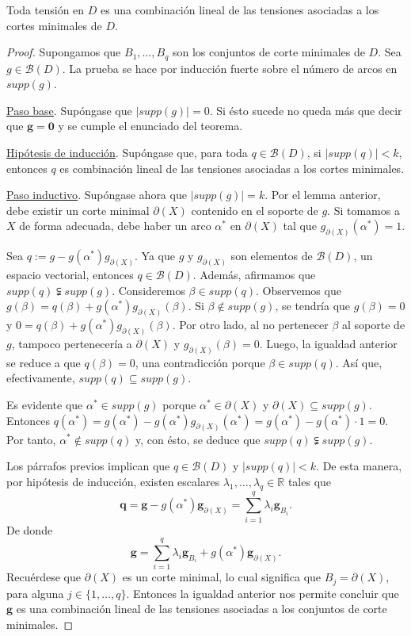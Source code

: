 \begin{teo}  \label{teo:tensiones}
Toda tensión en $D$ es una combinación lineal de las tensiones asociadas a los cortes minimales de $D$.
\end{teo}
\begin{proof}
Supongamos que $B_{1}, \ldots, B_{q}$ son los conjuntos de corte minimales de $D$.
Sea $g \in \mathcal{B}(D)$. La prueba se hace por inducción fuerte sobre el número de arcos en $supp(g)$.

\underline{Paso base}. Supóngase que $|supp(g)| = 0$. Si ésto sucede no queda más que decir que $\mathbf{g}= \mathbf{0}$ y se cumple el enunciado del teorema.

\underline{Hipótesis de inducción}. Supóngase que, para toda $q \in \mathcal{B}(D)$, si $|supp(q)|< k$, entonces $q$ es combinación lineal de las tensiones asociadas a los cortes minimales.

\underline{Paso inductivo}. Supóngase ahora que $|supp(g)| = k$. Por el lemma anterior, debe existir un corte minimal $\partial(X)$ contenido en el soporte de $g$. Si tomamos a $X$ de forma adecuada, debe haber un arco $\alpha^{*}$ en $\partial(X)$ tal que $g_{\partial(X)}(\alpha^{*})= 1$. 

Sea $q:=g - g(\alpha^{*})g_{\partial(X)}$. Ya que $g$ y $g_{\partial(X)}$ son elementos de $\mathcal{B}(D)$, un espacio vectorial, entonces $q \in \mathcal{B}(D)$. Además, afirmamos que $supp(q)\subsetneqq supp(g)$. Consideremos $\beta \in supp(q)$. Observemos que $g(\beta) = q(\beta) + g(\alpha^{*})g_{\partial(X)}(\beta)$. Si $\beta \notin supp(g)$, se tendría que  $g(\beta)=0$ y  $0 = q(\beta) + g(\alpha^{*})g_{\partial(X)}(\beta)$. Por otro lado, al no pertenecer $\beta$ al soporte de $g$, tampoco pertenecería a $\partial(X)$ y $g_{\partial(X)}(\beta) = 0$. Luego, la igualdad anterior se reduce a que $q(\beta)= 0$, una contradicción porque $\beta \in supp(q)$. Así que, efectivamente, $supp(q) \subseteq supp(g)$.

Es evidente que $\alpha^{*} \in supp(g)$ porque $\alpha^{*} \in \partial(X)$ y $\partial(X) \subseteq supp(g)$. Entonces $q(\alpha^{*}) = g(\alpha^{*}) - g(\alpha^{*})g_{\partial(X)}(\alpha^{*}) = g(\alpha^{*}) - g(\alpha^{*})\cdot1 = 0$. Por tanto, $\alpha^{*} \notin supp(q)$ y, con ésto, se deduce que $supp(q) \subsetneqq supp(g)$.

Los párrafos previos implican que $q \in \mathcal{B}(D)$ y $|supp(q)|<k$. De esta manera, por hipótesis de inducción, existen escalares $\lambda_{1}, \ldots, \lambda_{q} \in \mathbb{R}$ tales que 
$$
\mathbf{q} = \mathbf{g} - g(\alpha^{*})\mathbf{g}_{\partial(X)} = \sum_{i=1}^{q} \lambda_{i}\mathbf{g}_{B_{i}}.
$$
De donde
$$
\mathbf{g} = \sum_{i=1}^{q} \lambda_{i}\mathbf{g}_{B_{i}} + g(\alpha^{*})\mathbf{g}_{\partial(X)}.
$$
Recuérdese que $\partial(X)$ es un corte minimal, lo cual significa que $B_{j}=\partial(X)$, para alguna $j \in \{1, \ldots, q\}$. Entonces la igualdad anterior nos permite concluir que $\mathbf{g}$ es una combinación lineal de las tensiones asociadas a los conjuntos de corte minimales.

\end{proof}

